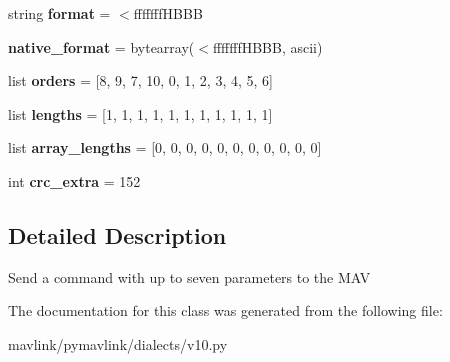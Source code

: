 \begin{DoxyCompactItemize}
\item 
\mbox{\label{classpymavlink_1_1dialects_1_1v10_1_1MAVLink__command__long__message_afd1a1725ef1b1ec7de0a9cbdca842b8c}} 
string {\bfseries format} = \textquotesingle{}$<$fffffff\+H\+B\+BB\textquotesingle{}
\item 
\mbox{\label{classpymavlink_1_1dialects_1_1v10_1_1MAVLink__command__long__message_a814d89f4110f4920d92572110c6ddfe6}} 
{\bfseries native\+\_\+format} = bytearray(\textquotesingle{}$<$fffffff\+H\+B\+BB\textquotesingle{}, \textquotesingle{}ascii\textquotesingle{})
\item 
\mbox{\label{classpymavlink_1_1dialects_1_1v10_1_1MAVLink__command__long__message_a2508ab95981c917400b364803d7b3f57}} 
list {\bfseries orders} = \mbox{[}8, 9, 7, 10, 0, 1, 2, 3, 4, 5, 6\mbox{]}
\item 
\mbox{\label{classpymavlink_1_1dialects_1_1v10_1_1MAVLink__command__long__message_a8ce887c5fa6da843ed5d10e78a590315}} 
list {\bfseries lengths} = \mbox{[}1, 1, 1, 1, 1, 1, 1, 1, 1, 1, 1\mbox{]}
\item 
\mbox{\label{classpymavlink_1_1dialects_1_1v10_1_1MAVLink__command__long__message_ab28bff9c432df31916d13749ff61e19b}} 
list {\bfseries array\+\_\+lengths} = \mbox{[}0, 0, 0, 0, 0, 0, 0, 0, 0, 0, 0\mbox{]}
\item 
\mbox{\label{classpymavlink_1_1dialects_1_1v10_1_1MAVLink__command__long__message_ac41cff1cf04960124e77a99e7d1bd93a}} 
int {\bfseries crc\+\_\+extra} = 152
\end{DoxyCompactItemize}


\subsection{Detailed Description}
\begin{DoxyVerb}Send a command with up to seven parameters to the MAV
\end{DoxyVerb}
 

The documentation for this class was generated from the following file\+:\begin{DoxyCompactItemize}
\item 
mavlink/pymavlink/dialects/v10.\+py\end{DoxyCompactItemize}
